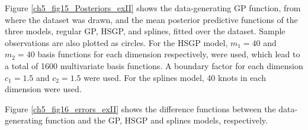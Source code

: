 \documentclass[onecolumn,a4paper,11pt]{article}
\begin{document}
Figure \ref{ch5_fig15_Posteriors_exII} shows the data-generating GP function, from where the dataset was drawn, and the mean posterior predictive functions of the three models, regular GP, HSGP, and splines, fitted over the dataset. Sample observations are also plotted as circles. For the HSGP model, $m_1=40$ and $m_2=40$ basis functions for each dimension respectively, were used, which lead to a total of 1600 multivariate basis functions. A boundary factor for each dimension $c_1=1.5$ and $c_2=1.5$ were used. For the splines model, 40 knots in each dimension were used.

Figure \ref{ch5_fig16_errors_exII} shows the difference functions between the data-generating function and the GP, HSGP and splines models, respectively.

\begin{figure}
\begin{center}
\begin{tabular}{ c c c}

\end{tabular}
\end{center}
\end{figure}
\end{document}
